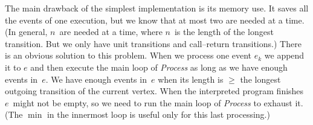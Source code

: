 The main drawback of the simplest implementation is its memory use.
It saves all the events of one execution, but we know that at most two are needed at a time.
(In general, $n$~are needed at a time, where $n$~is the length of the longest transition.
But we only have unit transitions and call--return transitions.)
There is an obvious solution to this problem.
When we process one event $e_k$ we append it to $e$ and then execute the main loop of {\it Process\/} as long as we have enough events in~$e$.
We have enough events in~$e$ when its length is $\ge$ the longest outgoing transition of the current vertex.
When the interpreted program finishes $e$~might not be empty, so we need to run the main loop of {\it Process\/} to exhaust it.
(The $\min$ in the innermost loop is useful only for this last processing.)


\bye

